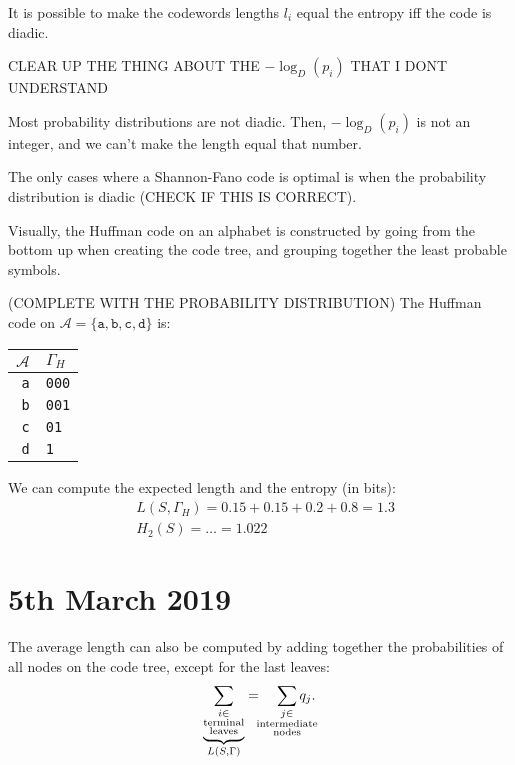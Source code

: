 \documentclass{report}
\begin{document}
\begin{thm}
	It is possible to make the codewords lengths $l_i$ equal the entropy iff the code is diadic.
\end{thm}

CLEAR UP THE THING ABOUT THE $-\log_D(p_i)$ THAT I DONT UNDERSTAND

\begin{remark}
	Most probability distributions are not diadic. Then, $-\log_D(p_i)$ is not an integer, and we can't make the length equal that number. \par
	The only cases where a Shannon-Fano code is optimal is when the probability distribution is diadic (CHECK IF THIS IS CORRECT).
\end{remark}

\begin{defn}
 Visually, the Huffman code on an alphabet is constructed by going from the bottom up when creating the code tree, and grouping together the least probable symbols.
\end{defn}

\begin{exmp} (COMPLETE WITH THE PROBABILITY DISTRIBUTION) The Huffman code on $\mathcal A = \{\texttt a, \texttt b, \texttt c, \texttt d\}$ is:
	\begin{center}
	\begin{tabular}{r | l}
		$\mathcal A$ & $\Gamma_H$ \\ \hline
		\texttt a & \texttt{000} \\
		\texttt b & \texttt{001} \\
		\texttt c & \texttt{01} \\
		\texttt d & \texttt{1}
	\end{tabular}
	\end{center}
 We can compute the expected length and the entropy (in bits):
	\begin{align*}
		&L(S, \Gamma_H) = 0.15 + 0. 15 + 0.2 + 0.8 = 1.3 \\
		&H_2(S) = \ldots = 1.022
	\end{align*}
\end{exmp}

\section{5th March 2019}

\begin{thm}
	The average length can also be computed by adding together the probabilities of all nodes on the code tree, except for the last leaves:
	\begin{equation}
		\underbrace{\sum_{\substack{i \in \\ \text{terminal} \\ \text{leaves}}}}_{L(S, \Gamma)} = \quad \sum_{\mathclap{\substack{j \in \\ \text{intermediate} \\ \text{nodes}}}} q_j.
	\end{equation}
\end{thm}
\end{document}

